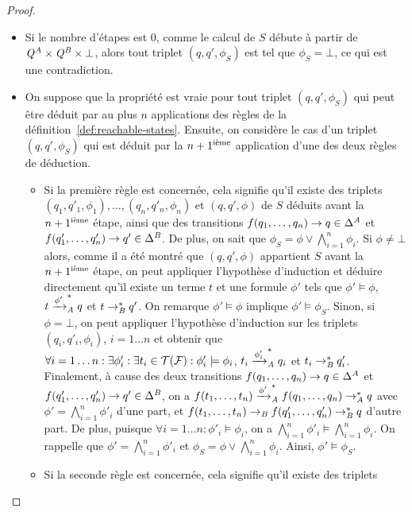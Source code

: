 \begin{proof}
\begin{itemize}
\item Si le nombre d'étapes est $0$, comme le calcul de $S$ débute
  à partir de $\Q^\A \times \Q^\B \times \bot$, alors tout triplet $(q,q',\phi_S)$
  est tel que $\phi_S=\bot$, ce qui est une contradiction.

\item On suppose que la propriété est vraie pour tout triplet $(q,q',\phi_S)$ qui peut être
  déduit par au plus $n$ applications des règles de la définition~\ref{def:reachable-states}.
  Ensuite, on considère le cas d'un triplet $(q,q',\phi_S)$ qui est déduit 
  par la $n+1^\iem$ application d'une des deux règles de déduction.
  \begin{itemize}
  \item Si la première règle est concernée, cela signifie qu'il existe
    des triplets  $(q_1,q'_1, \phi_1),\ldots,(q_n,q'_n,\phi_n)$ et $(q,q',\phi)$ de $S$
    déduits avant la $n+1^\iem$ étape, ainsi que des transitions $f(q_1,\ldots,q_n)\rw q
    \in \Delta^\A$ et $f(q'_1,\ldots,q'_n)\rw q' \in \Delta^\B$. De plus,
    on sait que $\phi_S=\phi \vee \bigwedge_{i=1}^n \phi_i$.
    Si $\phi\neq \bot$ alors, comme il a été montré que $(q,q',\phi)$ appartient $S$
    avant la $n+1^\iem$ étape, on peut appliquer l'hypothèse d'induction et déduire directement
    qu'il existe un terme $t$ et une formule $\phi'$ tels que $\phi'
    \models \phi$, $t \xrw{\phi'}^*_\A q$ et $t \rwB^* q'$. On remarque $\phi'
    \models \phi$ implique $\phi' \models \phi_S$.
    Sinon, si $\phi=\bot$, %
    on peut appliquer l'hypothèse d'induction sur les triplets $(q_i,q'_i,\phi_i)$,
    $i=1\ldots n$ et obtenir que $\forall i=1\ldots n:\exists \phi_i':\exists
    t_i \in\TF: \phi'_i \models \phi_i$, $t_i \xrw{\phi_i'}_\A^* q_i$ et $t_i
    \rwB^* q'_i$. Finalement, 
    à cause des deux transitions $f(q_1,\ldots,q_n)\rw q \in \Delta^\A$ et
    $f(q'_1,\ldots,q'_n)\rw q' \in \Delta^\B$, on a $f(t_1,\ldots,t_n)
    \xrw{\phi'}_\A^* f(q_1,\ldots,q_n) \rwA^* q$ avec
    $\phi'=\bigwedge_{i=1}^n \phi'_i$ d'une part, et $f(t_1,\ldots,t_n) 
    \rwB f(q'_1,\ldots,q'_n) \rwB^* q$ d'autre part. De plus,
    puisque $\forall i=1\ldots n: \phi'_i \models \phi_i$, on a 
    $\bigwedge_{i=1}^n \phi'_i \models \bigwedge_{i=1}^n \phi_i$. On rappelle que
    $\phi'= \bigwedge_{i=1}^n \phi'_i$ et $\phi_S= \phi\vee \bigwedge_{i=1}^n
    \phi_i$. Ainsi, $\phi' \models \phi_S$.
  \item Si la seconde règle est concernée, cela signifie qu'il existe des triplets

\end{itemize}
\end{itemize}
\end{proof}
